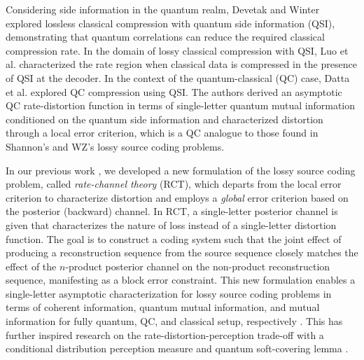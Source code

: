 Considering side information in the quantum realm,  
Devetak and Winter \cite{devetak2003classical} explored lossless classical compression with quantum side information (QSI), demonstrating that quantum correlations can reduce the required classical compression rate. 
In the domain of lossy classical compression with QSI, Luo et al. \cite{luo2009channel} characterized the rate region when classical data is compressed in the presence of QSI at the decoder. 
In the context of the quantum-classical (QC) case, Datta et al. \cite{datta2013quantum} explored QC compression using QSI. The authors derived an asymptotic QC rate-distortion function in terms of single-letter quantum mutual information conditioned on the quantum side information and characterized distortion through a local error criterion, which is a QC analogue to those found in Shannon's and WZ's lossy source coding problems.

In our previous work \cite{sohail2023unique}, we developed a new formulation of the lossy source coding problem, called \textit{rate-channel theory} (RCT), which departs from the local error criterion to characterize distortion and employs a \textit{global} error criterion based on the posterior (backward) channel. In RCT, a single-letter posterior channel is given that characterizes the nature of loss instead of a single-letter distortion function. The goal is to construct a coding system such that the joint effect of producing a reconstruction sequence from the source sequence closely matches the effect of the $n$-product posterior channel on the non-product reconstruction sequence, manifesting as a block error constraint. This new formulation enables a single-letter asymptotic characterization for lossy source coding problems in terms of coherent information, quantum mutual information, and mutual information for fully quantum, QC, and classical setup, respectively \cite{atif2023lossy}. This has further inspired research on the rate-distortion-perception trade-off with a conditional distribution perception measure \cite{salehkalaibar2024rate} and quantum soft-covering lemma \cite{atif2023quantum}.


